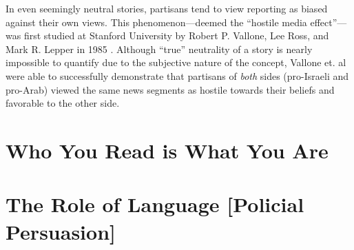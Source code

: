 In even seemingly neutral stories, partisans tend to view reporting as biased against their own views. This phenomenon---deemed the ``hostile media effect''---was first studied at Stanford University by Robert P. Vallone, Lee Ross, and Mark R. Lepper in 1985 \cite{vallone1985hostile}. Although ``true'' neutrality of a story is nearly impossible to quantify due to the subjective nature of the concept, Vallone et. al were able to successfully demonstrate that partisans of \emph{both} sides (pro-Israeli and pro-Arab) viewed the same news segments as hostile towards their beliefs and favorable to the other side.

  

\section{Who You Read is What You Are}






 









\section{The Role of Language [Policial Persuasion]}




